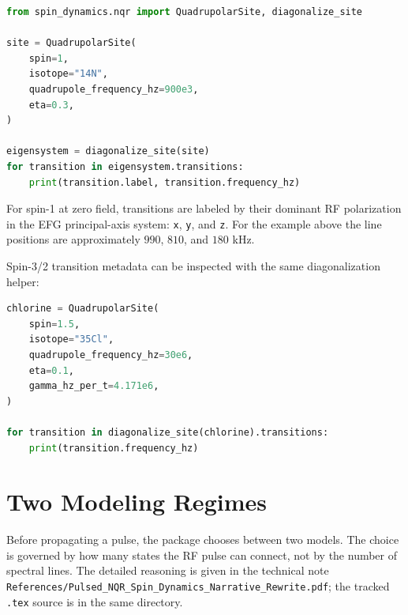\documentclass[11pt,oneside]{report}
\newcommand{\code}[1]{\texttt{#1}}
\begin{document}
\begin{lstlisting}[language=Python]
from spin_dynamics.nqr import QuadrupolarSite, diagonalize_site

site = QuadrupolarSite(
    spin=1,
    isotope="14N",
    quadrupole_frequency_hz=900e3,
    eta=0.3,
)

eigensystem = diagonalize_site(site)
for transition in eigensystem.transitions:
    print(transition.label, transition.frequency_hz)
\end{lstlisting}

For spin-1 at zero field, transitions are labeled by their dominant RF
polarization in the EFG principal-axis system: \code{x}, \code{y}, and
\code{z}. For the example above the line positions are approximately
\(990\), \(810\), and \(180\) kHz.

Spin-3/2 transition metadata can be inspected with the same diagonalization
helper:

\begin{lstlisting}[language=Python]
chlorine = QuadrupolarSite(
    spin=1.5,
    isotope="35Cl",
    quadrupole_frequency_hz=30e6,
    eta=0.1,
    gamma_hz_per_t=4.171e6,
)

for transition in diagonalize_site(chlorine).transitions:
    print(transition.frequency_hz)
\end{lstlisting}

\section{Two Modeling Regimes}
\label{sec:nqr-regimes}

Before propagating a pulse, the package chooses between two models. The choice
is governed by how many states the RF pulse can connect, not by the number of
spectral lines. The detailed reasoning is given in the technical note
\code{References/Pulsed\_NQR\_Spin\_Dynamics\_Narrative\_Rewrite.pdf}; the
tracked \code{.tex} source is in the same directory.
\end{document}
